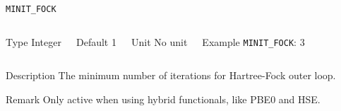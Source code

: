     
    \begin{frame}[allowframebreaks]{\texttt{MINIT\_FOCK}} \label{MINIT_FOCK}
    \vspace*{-12pt}
    \begin{columns}
    \begin{block}{Type}
    Integer
    \end{block}
    
    \begin{block}{Default}
    1
    \end{block}
    
    \begin{block}{Unit}
    No unit
    \end{block}
    
    \begin{block}{Example}
    \texttt{MINIT\_FOCK}: 3
    \end{block}
    \end{columns}
    
    \begin{block}{Description}
    The minimum number of iterations for Hartree-Fock outer loop.
    \end{block}
    
    \begin{block}{Remark}
    Only active when using hybrid functionals, like PBE0 and HSE. 
    \end{block}
    
    \end{frame}
    
